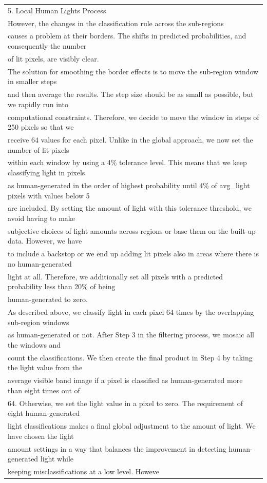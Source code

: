 \documentclass[11pt,preprint, authoryear]{elsarticle}
\numberwithin{equation}{section}
\numberwithin{figure}{section}
\numberwithin{table}{section}
\begin{document}
\begin{longtable}[]{@{}l@{}}
\toprule
\endhead
5. Local Human Lights Process \\
However, the changes in the classification rule across the
sub-regions \\
causes a problem at their borders. The shifts in predicted
probabilities, and consequently the number \\
of lit pixels, are visibly clear. \\
The solution for smoothing the border effects is to move the sub-region
window in smaller steps \\
and then average the results. The step size should be as small as
possible, but we rapidly run into \\
computational constraints. Therefore, we decide to move the window in
steps of 250 pixels so that we \\
receive 64 values for each pixel. Unlike in the global approach, we now
set the number of lit pixels \\
within each window by using a 4\% tolerance level. This means that we
keep classifying light in pixels \\
as human-generated in the order of highest probability until 4\% of
avg\_light pixels with values below 5 \\
are included. By setting the amount of light with this tolerance
threshold, we avoid having to make \\
subjective choices of light amounts across regions or base them on the
built-up data. However, we have \\
to include a backstop or we end up adding lit pixels also in areas where
there is no human-generated \\
light at all. Therefore, we additionally set all pixels with a predicted
probability less than 20\% of being \\
human-generated to zero. \\
As described above, we classify light in each pixel 64 times by the
overlapping sub-region windows \\
as human-generated or not. After Step 3 in the filtering process, we
mosaic all the windows and \\
count the classifications. We then create the final product in Step 4 by
taking the light value from the \\
average visible band image if a pixel is classified as human-generated
more than eight times out of \\
64. Otherwise, we set the light value in a pixel to zero. The
requirement of eight human-generated \\
light classifications makes a final global adjustment to the amount of
light. We have chosen the light \\
amount settings in a way that balances the improvement in detecting
human-generated light while \\
keeping misclassifications at a low level. Howeve \\
\bottomrule
\end{longtable}
\end{document}

